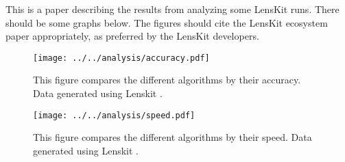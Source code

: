 \documentclass{article}
\begin{document}
This is a paper describing the results from analyzing some LensKit
runs.  There should be some graphs below.  The figures should cite the
LensKit ecosystem paper appropriately, as preferred by the LensKit
developers. 

\begin{figure}
\begin{center}
\texttt{[image: ../../analysis/accuracy.pdf]}
\caption{This figure compares the different algorithms by their
accuracy.  Data generated using Lenskit \cite{lenskit-ecosystem}.}
\end{center}
\end{figure}

\begin{figure}  
\begin{center}
\texttt{[image: ../../analysis/speed.pdf]}
\caption{This figure compares the different algorithms by their
speed.    Data generated using Lenskit \cite{lenskit-ecosystem}.}
\end{center}
\end{figure}



\end{document}
